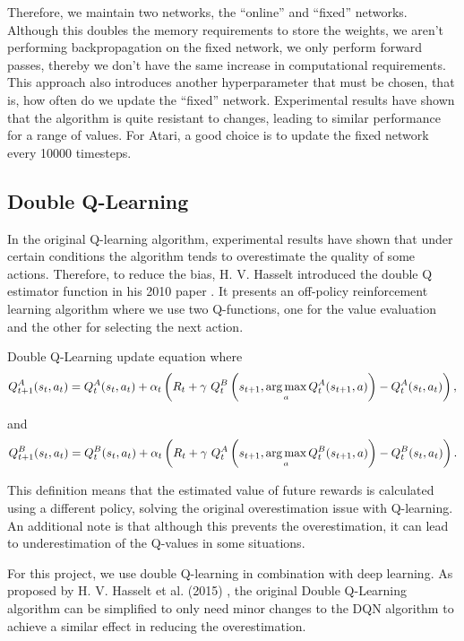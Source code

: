 Therefore, we maintain two networks, the ``online'' and ``fixed'' networks. Although this doubles the memory requirements to store the weights, we aren't performing backpropagation on the fixed network, we only perform forward passes, thereby we don't have the same increase in computational requirements. This approach also introduces another hyperparameter that must be chosen, that is, how often do we update the ``fixed'' network. Experimental results have shown that the algorithm is quite resistant to changes, leading to similar performance for a range of values. For Atari, a good choice is to update the fixed network every 10000 timesteps.

\subsection{Double Q-Learning}
\label{dsgn:sec:qlearning:doubledqn}
In the original Q-learning algorithm, experimental results have shown that under certain conditions the algorithm tends to overestimate the quality of some actions. Therefore, to reduce the bias, H. V. Hasselt introduced the double Q estimator function in his 2010 paper \cite{double-ql}. It presents an off-policy reinforcement learning algorithm where we use two Q-functions, one for the value evaluation and the other for selecting the next action.

\begin{defn}
	Double Q-Learning update equation where
	\[
		Q_{t+1}^A (s_t, a_t) = Q_t^A (s_t, a_t) + \alpha_t \left( R_t + \gamma~Q_t^B \left( s_{t + 1}, \operatorname*{arg\,max}_a Q_t^A (s_{t + 1}, a) \right) - Q_t^A (s_t, a_t) \right) ,
	\]

	and
	\[
		Q_{t+1}^B (s_t, a_t) = Q_t^B (s_t, a_t) + \alpha_t \left( R_t + \gamma~Q_t^A \left( s_{t + 1}, \operatorname*{arg\,max}_a Q_t^B (s_{t + 1}, a) \right) - Q_t^B (s_t, a_t) \right) .
	\]
\end{defn}

This definition means that the estimated value of future rewards is calculated using a different policy, solving the original overestimation issue with Q-learning. An additional note is that although this prevents the overestimation, it can lead to underestimation of the Q-values in some situations.

For this project, we use double Q-learning in combination with deep learning. As proposed by H. V. Hasselt et al. (2015) \cite{deep-double-qlearning}, the original Double Q-Learning algorithm can be simplified to only need minor changes to the DQN algorithm to achieve a similar effect in reducing the overestimation.

